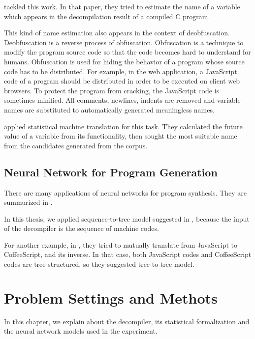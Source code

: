 \documentclass[senior,final,11pt]{iscs-thesis}
\begin{document}
\cite{name_recover_from_decompile_result} tackled this work. 
In that paper, they tried to estimate the name of a variable which appears in the decompilation result of a compiled C program.

This kind of name estimation also appears in the context of deobfuscation.
\cite{deobfsucation_matome}
Deobfuscation is a reverse process of obfuscation.
Obfuscation is a technique to modify the program source code so that the code becomes hard to understand for humans. 
Obfuscation is used for hiding the behavior of a program whose source code has to be distributed.
For example, in the web application, a JavaScript code of a program should be distributed in order to be executed on client web browsers.
To protect the program from cracking, the JavaScript code is sometimes minified. All comments, newlines, indents are removed and variable names are substituted to automatically generated meaningless names. 

\cite{JSNaughty} applied statistical machine translation for this task. 
They calculated the future value of a variable from its functionality, then 
sought the most suitable name from the candidates generated from the corpus.


\section{Neural Network for Program Generation}

There are many applications of neural networks for program synthesis. They are summurized in \cite{deep_programming_matome}.

In this thesis, we applied sequence-to-tree model suggested in \cite{Seq2Tree}, because the input of the decompiler is the sequence of machine codes.

For another example, in \cite{coffeescript_to_javascript}, they tried to mutually translate from JavaScript to CoffeeScript, and its inverse.
In that case, both JavaScript codes and CoffeeScript codes are tree structured, so they suggested tree-to-tree model.


\chapter{Problem Settings and Methots}

In this chapter, we explain about the decompiler, its statistical formalization and 
the neural network models used in the experiment.
\end{document}
